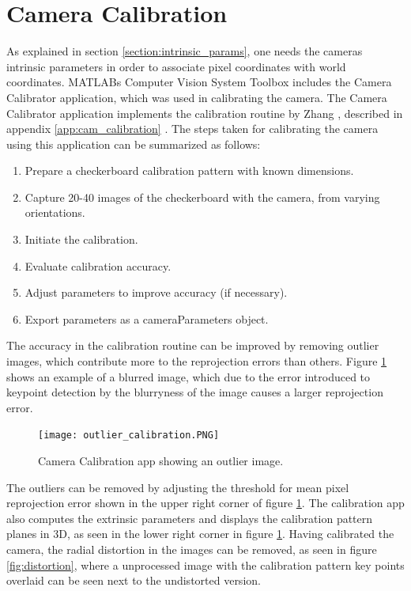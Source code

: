 \section{Camera Calibration}
As explained in section \ref{section:intrinsic_params}, one needs the cameras intrinsic parameters in order to associate pixel coordinates with world coordinates. MATLABs Computer Vision System Toolbox includes the Camera Calibrator application, which was used in calibrating the camera. The Camera Calibrator application implements the calibration routine by Zhang \cite{flexCal}, described in appendix \ref{app:cam_calibration} \cite{camera_calibrator}. The steps taken for calibrating the camera using this application can be summarized as follows:
\begin{enumerate}
	\item Prepare a checkerboard calibration pattern with known dimensions.
	\item Capture 20-40 images of the checkerboard with the camera, from varying orientations.
	\item Initiate the calibration.
	\item Evaluate calibration accuracy.
	\item Adjust parameters to improve accuracy (if necessary).
	\item Export parameters as a cameraParameters object.
\end{enumerate}
The accuracy in the calibration routine can be improved by removing outlier images, which contribute more to the reprojection errors than others. Figure \ref{fig:calib_outlier} shows an example of a blurred image, which due to the error introduced to keypoint detection by the blurryness of the image causes a larger reprojection error.
\begin{figure}[H]
	\centering
	\texttt{[image: outlier\_calibration.PNG]}
	\caption{Camera Calibration app showing an outlier image.}
	\label{fig:calib_outlier}
\end{figure}
The outliers can be removed by adjusting the threshold for mean pixel reprojection error shown in the upper right corner of figure \ref{fig:calib_outlier}. The calibration app also computes the extrinsic parameters and displays the calibration pattern planes in 3D, as seen in the lower right corner in figure \ref{fig:calib_outlier}.
Having calibrated the camera, the radial distortion in the images can be removed, as seen in figure \ref{fig:distortion}, where a unprocessed image with the calibration pattern key points overlaid can be seen next to the undistorted version.
